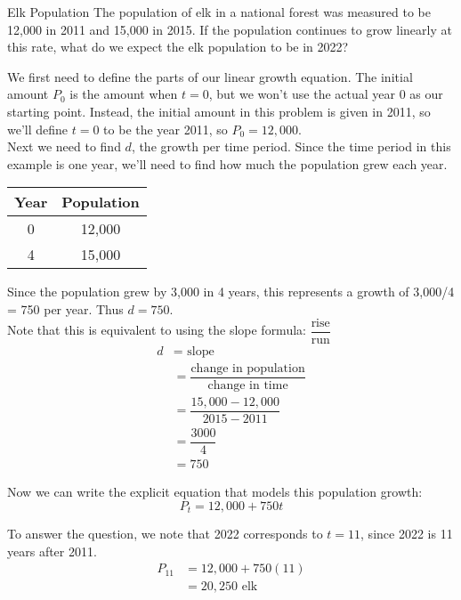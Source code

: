\begin{example}[https://www.youtube.com/watch?v=cpaNK4jbMkA]{Elk Population}
The population of elk in a national forest was measured to be 12,000 in 2011 and 15,000 in 2015.  If the population continues to grow linearly at this rate, what do we expect the elk population to be in 2022?

\solline
{}
We first need to define the parts of our linear growth equation.  The initial amount $P_0$ is the amount when $t=0$, but we won't use the actual year 0 as our starting point.  Instead, the initial amount in this problem is given in 2011, so we'll define $t=0$ to be the year 2011, so $P_0=12,000$.\\

Next we need to find $d$, the growth per time period.  Since the time period in this example is one year, we'll need to find how much the population grew each year.
\begin{center}
\begin{tabular}{c c}
\textbf{Year} & \textbf{Population}\\
\hline
0 & 12,000\\
4 & 15,000
\end{tabular}
\end{center}
Since the population grew by 3,000 in 4 years, this represents a growth of 3,000/4 = 750 per year.  Thus $d=750$.\\

Note that this is equivalent to using the slope formula: $\dfrac{\textrm{rise}}{\textrm{run}}$
\begin{align*}
d &= \textrm{ slope }\\
&= \dfrac{\textrm{change in population}}{\textrm{change in time}}\\
&= \dfrac{15,000 - 12,000}{2015 - 2011}\\
&= \dfrac{3000}{4}\\
&= 750
\end{align*}

Now we can write the explicit equation that models this population growth:
\[P_t = 12,000 + 750t\]

To answer the question, we note that 2022 corresponds to $t=11$, since 2022 is 11 years after 2011.
\begin{align*}
P_{11} &= 12,000 + 750(11)\\
&= \boxed{20,250 \textrm{ elk}}
\end{align*}
\end{example}

